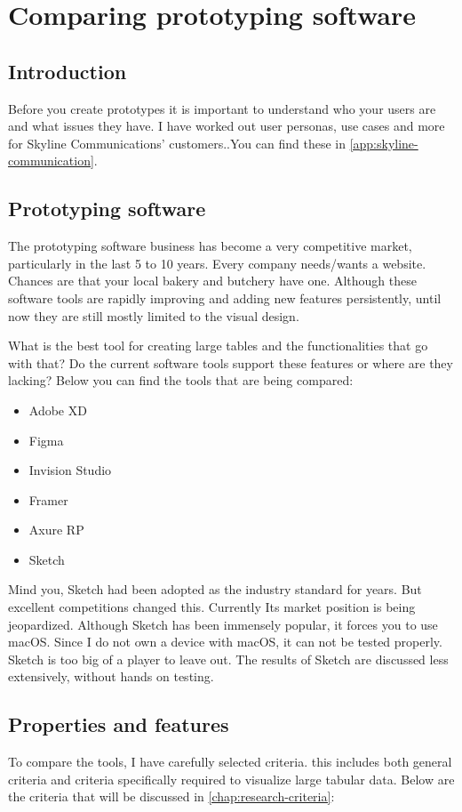 \chapter{Comparing prototyping software}

\section{Introduction}
Before you create prototypes it is important to understand who your users are and what issues they have. I have worked out user personas, use cases and more for Skyline Communications' customers..You can find these in \autoref{app:skyline-communication}.

\section{Prototyping software}
The prototyping software business has become a very competitive market, particularly in the last 5 to 10 years. Every company needs/wants a website. Chances are that your local bakery and butchery have one. Although these software tools are rapidly improving and adding new features persistently, until now they are still mostly limited to the visual design.

What is the best tool for creating large tables and the functionalities that go with that? Do the current software tools support these features or where are they lacking? Below you can find the tools that are being compared:
\begin{itemize}
    \setlength\itemsep{-0.5em}                                    
    \item {Adobe XD}
    \item {Figma}
    \item {Invision Studio}
    \item {Framer}
    \item {Axure RP}
    \item {Sketch}
\end{itemize}

Mind you, Sketch had been adopted as the industry standard for years. But excellent competitions changed this. Currently Its market position is being jeopardized. Although Sketch has been immensely popular, it forces you to use macOS. Since I do not own a device with macOS, it can not be tested properly. Sketch is too big of a player to leave out. The results of Sketch are discussed less extensively, without hands on testing. 

\section{Properties and features}
To compare the tools, I have carefully selected criteria. this includes both general criteria and criteria specifically required to visualize large tabular data. Below are the criteria that will be discussed in \autoref{chap:research-criteria}:  

